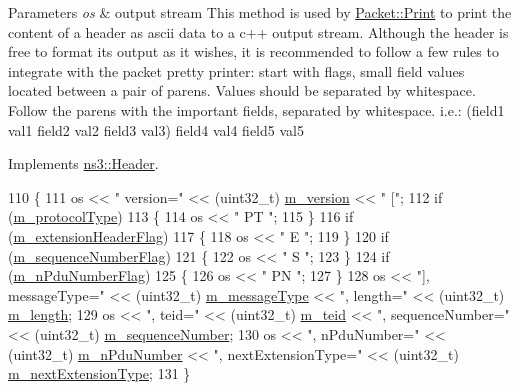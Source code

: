 \begin{DoxyParams}{Parameters}
{\em os} & output stream This method is used by \hyperlink{classns3_1_1Packet_aa34058a5cdbf94673531f8c4001ab227}{Packet\+::\+Print} to print the content of a header as ascii data to a c++ output stream. Although the header is free to format its output as it wishes, it is recommended to follow a few rules to integrate with the packet pretty printer\+: start with flags, small field values located between a pair of parens. Values should be separated by whitespace. Follow the parens with the important fields, separated by whitespace. i.\+e.\+: (field1 val1 field2 val2 field3 val3) field4 val4 field5 val5 \\
\hline
\end{DoxyParams}


Implements \hyperlink{classns3_1_1Header_a2ce1df7579b2ade7bc7302357feac77a}{ns3\+::\+Header}.


\begin{DoxyCode}
110 \{
111   os << \textcolor{stringliteral}{" version="} << (uint32\_t) \hyperlink{classns3_1_1GtpuHeader_ab0bd6fd08e361f9bb35ce1160bf8b263}{m\_version} << \textcolor{stringliteral}{" ["};
112   \textcolor{keywordflow}{if} (\hyperlink{classns3_1_1GtpuHeader_a48a7c185f083bc8da2ee925b4766c69f}{m\_protocolType})
113     \{
114       os << \textcolor{stringliteral}{" PT "};
115     \}
116   \textcolor{keywordflow}{if} (\hyperlink{classns3_1_1GtpuHeader_a30bd9a75b36836bf46574001327e9e20}{m\_extensionHeaderFlag})
117     \{
118       os << \textcolor{stringliteral}{" E "};
119     \}
120   \textcolor{keywordflow}{if} (\hyperlink{classns3_1_1GtpuHeader_ae659c2713a5a90d90312a329827f1f07}{m\_sequenceNumberFlag})
121     \{
122       os << \textcolor{stringliteral}{" S "};
123     \}
124   \textcolor{keywordflow}{if} (\hyperlink{classns3_1_1GtpuHeader_a2b5367fdc1e0be87bcd9b9911853a64e}{m\_nPduNumberFlag})
125     \{
126       os << \textcolor{stringliteral}{" PN "};
127     \}
128   os << \textcolor{stringliteral}{"], messageType="} << (uint32\_t) \hyperlink{classns3_1_1GtpuHeader_a5295b542b750d59ed3dd62cfa33e1413}{m\_messageType} << \textcolor{stringliteral}{", length="} << (uint32\_t) 
      \hyperlink{classns3_1_1GtpuHeader_ab6f0dc585ae24ecbdc8dc8fb12bcf54f}{m\_length};
129   os << ", teid=" << (uint32\_t) \hyperlink{classns3_1_1GtpuHeader_a2245b21ba4c0c28116fa3099b9cb1f44}{m\_teid} << ", sequenceNumber=" << (uint32\_t) 
      \hyperlink{classns3_1_1GtpuHeader_a819665f22b6dfc6492799edf4984db53}{m\_sequenceNumber};
130   os << ", nPduNumber=" << (uint32\_t) \hyperlink{classns3_1_1GtpuHeader_a807ca692a4cfc9124abf02544f3d096a}{m\_nPduNumber} << ", nextExtensionType=" << (uint32\_t) 
      \hyperlink{classns3_1_1GtpuHeader_a0fd669943a74011403a8be717e7f41c0}{m\_nextExtensionType};
131 \}
\end{DoxyCode}
